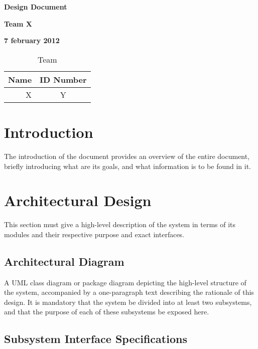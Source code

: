 \documentclass[12pt]{article}
\begin{document}
\vspace*{0.5in}
\centerline{\bf\Large Design Document}

\vspace*{0.5in}
\centerline{\bf\Large Team X}

\vspace*{0.5in}
\centerline{\bf\Large 7 february 2012}

\vspace*{1.5in}
\begin{table}[htbp]
\caption{Team}
\begin{center}
\begin{tabular}{|r | c|}
\hline
Name & ID Number \\
\hline\hline
X & Y \\
\hline
\end{tabular}
\end{center}
\end{table}

\clearpage

\section{Introduction}

The introduction of the document provides an overview of the entire document,
briefly introducing what are its goals, and what information is to be found in it.

\section{Architectural Design} \label{sec:arch}

This section must give a high-level description of the system in terms of its modules
and their respective purpose and exact interfaces.

\subsection{Architectural Diagram}

A UML class diagram or package diagram depicting the high-level structure of the system,
accompanied by a one-paragraph text describing the rationale of this design.
It is mandatory that the system be divided into at least two subsystems,
and that the purpose of each of these subsystems be exposed here.

\subsection{Subsystem Interface Specifications}
\end{document}
